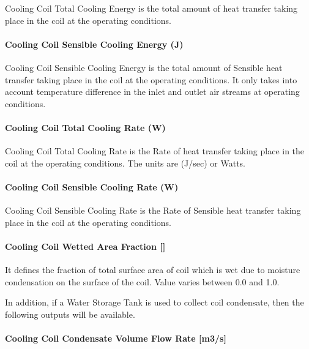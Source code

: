 Cooling Coil Total Cooling Energy is the total amount of heat transfer taking place in the coil at the operating conditions.

\paragraph{Cooling Coil Sensible Cooling Energy (J)}\label{cooling-coil-sensible-cooling-energy-j}

Cooling Coil Sensible Cooling Energy is the total amount of Sensible heat transfer taking place in the coil at the operating conditions. It only takes into account temperature difference in the inlet and outlet air streams at operating conditions.

\paragraph{Cooling Coil Total Cooling Rate (W)}\label{cooling-coil-total-cooling-rate-w}

Cooling Coil Total Cooling Rate is the Rate of heat transfer taking place in the coil at the operating conditions. The units are (J/sec) or Watts.

\paragraph{Cooling Coil Sensible Cooling Rate (W)}\label{cooling-coil-sensible-cooling-rate-w}

Cooling Coil Sensible Cooling Rate is the Rate of Sensible heat transfer taking place in the coil at the operating conditions.

\paragraph{\texorpdfstring{Cooling Coil Wetted Area Fraction {[]}}{Cooling Coil Wetted Area Fraction }}\label{cooling-coil-wetted-area-fraction}

It defines the fraction of total surface area of coil which is wet due to moisture condensation on the surface of the coil. Value varies between 0.0 and 1.0.

In addition, if a Water Storage Tank is used to collect coil condensate, then the following outputs will be available.

\paragraph{Cooling Coil Condensate Volume Flow Rate {[}m3/s{]}}\label{cooling-coil-condensate-volume-flow-rate-m3s}

